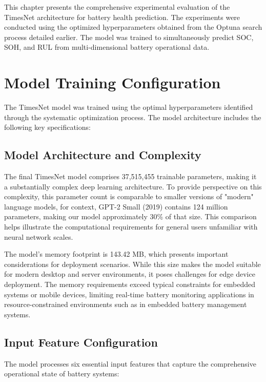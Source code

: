 This chapter presents the comprehensive experimental evaluation of the TimesNet architecture for battery health prediction. The experiments were conducted using the optimized hyperparameters obtained from the Optuna search process detailed earlier. The model was trained to simultaneously predict SOC, SOH, and RUL from multi-dimensional battery operational data.

\section{Model Training Configuration}
\label{sec:training_config}

The TimesNet model was trained using the optimal hyperparameters identified through the systematic optimization process. The model architecture includes the following key specifications:

\subsection{Model Architecture and Complexity}
\label{subsec:model_complexity}

The final TimesNet model comprises 37,515,455 trainable parameters, making it a substantially complex deep learning architecture. To provide perspective on this complexity, this parameter count is comparable to smaller versions of "modern" language models, for context, GPT-2 Small (2019) contains 124 million parameters, making our model approximately 30\% of that size. This comparison helps illustrate the computational requirements for general users unfamiliar with neural network scales.

The model's memory footprint is 143.42 MB, which presents important considerations for deployment scenarios. While this size makes the model suitable for modern desktop and server environments, it poses challenges for edge device deployment. The memory requirements exceed typical constraints for embedded systems or mobile devices, limiting real-time battery monitoring applications in resource-constrained environments such as in embedded battery management systems.

\subsection{Input Feature Configuration}
\label{subsec:input_features}

The model processes six essential input features that capture the comprehensive operational state of battery systems:

